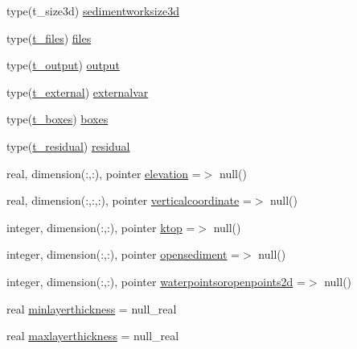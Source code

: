 \begin{DoxyCompactItemize}
\item 
type(t\+\_\+size3d) \mbox{\hyperlink{structmodulesediment_1_1t__sediment_ac8ae6a9f25df23c011bd7d22aa628fca}{sedimentworksize3d}}
\item 
type(\mbox{\hyperlink{structmodulesediment_1_1t__files}{t\+\_\+files}}) \mbox{\hyperlink{structmodulesediment_1_1t__sediment_ad697a793e2d44e1d5e4ee4f4d3e4fd48}{files}}
\item 
type(\mbox{\hyperlink{structmodulesediment_1_1t__output}{t\+\_\+output}}) \mbox{\hyperlink{structmodulesediment_1_1t__sediment_a966c082e88643ad1441cf55c75c4e58c}{output}}
\item 
type(\mbox{\hyperlink{structmodulesediment_1_1t__external}{t\+\_\+external}}) \mbox{\hyperlink{structmodulesediment_1_1t__sediment_ac7a018009dcd3a05eb752bc9c8311ad4}{externalvar}}
\item 
type(\mbox{\hyperlink{structmodulesediment_1_1t__boxes}{t\+\_\+boxes}}) \mbox{\hyperlink{structmodulesediment_1_1t__sediment_aa9843cf6465700d10aad623b86a9e6dc}{boxes}}
\item 
type(\mbox{\hyperlink{structmodulesediment_1_1t__residual}{t\+\_\+residual}}) \mbox{\hyperlink{structmodulesediment_1_1t__sediment_afddb74dec12795c87961242304d5a113}{residual}}
\item 
real, dimension(\+:,\+:), pointer \mbox{\hyperlink{structmodulesediment_1_1t__sediment_ae6e0a665e86c50d561b23f3c2c7bba61}{elevation}} =$>$ null()
\item 
real, dimension(\+:,\+:,\+:), pointer \mbox{\hyperlink{structmodulesediment_1_1t__sediment_a0ea6cedfb773b6afc662451a6300e666}{verticalcoordinate}} =$>$ null()
\item 
integer, dimension(\+:,\+:), pointer \mbox{\hyperlink{structmodulesediment_1_1t__sediment_a88c483fed096d3d8eb5f4201b65b5e3f}{ktop}} =$>$ null()
\item 
integer, dimension(\+:,\+:), pointer \mbox{\hyperlink{structmodulesediment_1_1t__sediment_a46e44d2cebd98e9fca3bf6b9a51a7d39}{opensediment}} =$>$ null()
\item 
integer, dimension(\+:,\+:), pointer \mbox{\hyperlink{structmodulesediment_1_1t__sediment_a1b1bc79891979de2433e3720d7507ffd}{waterpointsoropenpoints2d}} =$>$ null()
\item 
real \mbox{\hyperlink{structmodulesediment_1_1t__sediment_a925c8e40a0aae58b05a8ff12b301b689}{minlayerthickness}} = null\+\_\+real
\item 
real \mbox{\hyperlink{structmodulesediment_1_1t__sediment_acd906072d32c8e7861f549fae2645184}{maxlayerthickness}} = null\+\_\+real

\end{DoxyCompactItemize}
